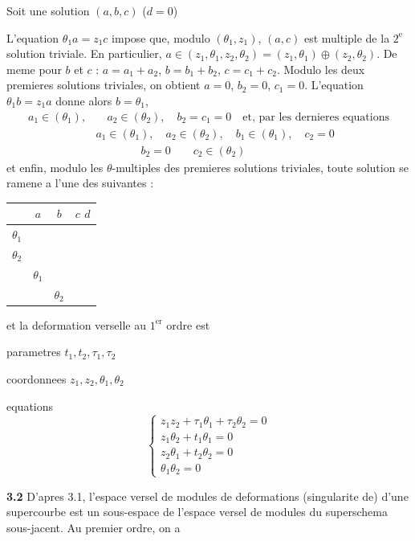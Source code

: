 \documentclass[11pt,a4paper]{article}
\theoremstyle{plain}
\theoremstyle{definition}
\begin{document}
\hfill Soit une solution $(a,b,c)$ ($d = 0$)

L'equation $\theta_1 a = z_1 c$ impose que, modulo $(\theta_1, z_1)$, $(a,c)$ est multiple de la $2^{\text{e}}$ solution triviale. En particulier, $a \in (z_1, \theta_1, z_2, \theta_2) = (z_1, \theta_1) \oplus (z_2, \theta_2)$. De meme pour $b$ et $c$ : $a = a_1 + a_2$, $b = b_1 + b_2$, $c = c_1 + c_2$. Modulo les deux premieres solutions triviales, on obtient $a = 0$, $b_2 = 0$, $c_1 = 0$. L'equation $\theta_1 b = z_1 a$ donne alors $b = \theta_1$,
\[
\begin{aligned}
a_1 \in (\theta_1), &\quad a_2 \in (\theta_2), \quad b_2 = c_1 = 0 \quad \text{et, par les dernieres equations} \\
& a_1 \in (\theta_1), \quad a_2 \in (\theta_2), \quad b_1 \in (\theta_1), \quad c_2 = 0 \\
& \qquad\qquad b_2 = 0 \qquad c_2 \in (\theta_2)
\end{aligned}
\]
et enfin, modulo les $\theta$-multiples des premieres solutions triviales, toute solution se ramene a l'une des suivantes :

\begin{center}
\begin{tabular}{|c|ccc|}
\hline
& $a$ & $b$ & $c$ \quad $d$ \\
\hline
$\theta_1$ & & & \\
$\theta_2$ & & & \\
& $\theta_1$ & & \\
& & $\theta_2$ & \\
\hline
\end{tabular}
\end{center}

et la deformation verselle au $1^{\text{er}}$ ordre est

parametres $t_1, t_2, \tau_1, \tau_2$

coordonnees $z_1, z_2, \theta_1, \theta_2$

equations
\[
\begin{cases}
z_1 z_2 + \tau_1 \theta_1 + \tau_2 \theta_2 = 0 \\
z_1 \theta_2 + t_1 \theta_1 = 0 \\
z_2 \theta_1 + t_2 \theta_2 = 0 \\
\theta_1 \theta_2 = 0
\end{cases}
\]

\newpage

\noindent \textbf{3.2} D'apres 3.1, l'espace versel de modules de deformations (singularite de) d'une supercourbe est un sous-espace de l'espace versel de modules du superschema sous-jacent. Au premier ordre, on a
\end{document}

